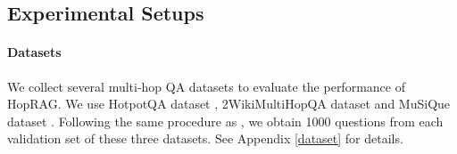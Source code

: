 \begin{table}[htb]
    \centering
    \caption{We report the QA performance metrics EM and F1 score with GPT-4o and top 20 passages here,  where the best score is in \textbf{bold} and the second best is \underline{underlined}.}
    \label{tab:QA-performance-4o}
\end{table}


\label{sec:experiment}
\subsection{Experimental Setups}
\paragraph{Datasets}
We collect several multi-hop QA datasets to evaluate the performance of HopRAG. We use HotpotQA dataset \citep{yang2018hotpotqadatasetdiverseexplainable}, 2WikiMultiHopQA dataset \citep{ho2020constructingmultihopqadataset} and MuSiQue dataset  \citep{trivedi2022musiquemultihopquestionssinglehop}. Following the same procedure as \citep{zhang2024sireragindexingsimilarrelated}, we obtain 1000 questions from each validation set of these three datasets. See Appendix \ref{dataset} for details.
